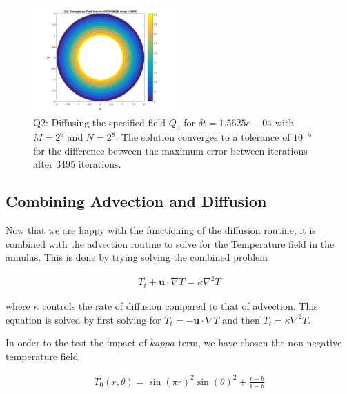 \documentclass{article}
\begin{document}
\begin{figure}[h!]
		\includegraphics[width = 0.49\textwidth]{fig_q2DiffuseTest3495}
		\caption{Q2: Diffusing the specified field $Q_0$ for $\delta t = 1.5625e-04$ with $M = 2^6$ and $N=2^8$. The solution converges to a tolerance of $10^{-5}$ for the difference between the maximum error between iterations after 3495 iterations.}
		\label{fig:q2DiffuseTest}
	\end{figure}

\subsection{Combining Advection and Diffusion}

Now that we are happy with the functioning of the diffusion routine, it is combined with the advection routine to solve for the Temperature field in the annulus. This is done by trying solving the combined problem 
	
\begin{align}
	T_t + \textbf{u} \cdot \nabla T = \kappa \nabla^2 T
\end{align}

where $\kappa$ controls the rate of diffusion compared to that of advection. This equation is solved by first solving for $T_t = - \textbf{u} \cdot \nabla T$ and then $T_t = \kappa \nabla^2 T$.

In order to the test the impact of $kappa$ term, we have chosen the non-negative temperature field

\begin{align}
	T_0(r,\theta) =  \sin(\pi r)^2 \sin(\theta)^2 + \frac{r-b}{1-b}
	\label{eq:q2T0}
\end{align}
\end{document}
